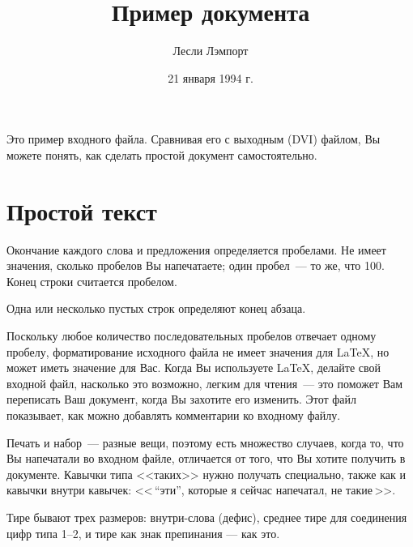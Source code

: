 \documentclass{article}      %
\title{Пример документа}     %
\author{Лесли Лэмпорт}       %
\date{21 января 1994 г.}     %
\begin{document}

\maketitle                   %

Это пример входного файла.  Сравнивая его с выходным (DVI)
файлом, Вы можете понять, как
сделать простой документ самостоятельно.

\section{Простой текст}      %

Окончание каждого слова и предложения определяется
  пробелами.    Не имеет значения, сколько пробелов Вы
напечатаете;           один пробел~--- то же, что 100.  Конец
строки считается пробелом.

Одна    или   несколько пустых строк определяют  конец
абзаца.

Поскольку любое количество последовательных пробелов отвечает одному
пробелу, форматирование исходного файла не имеет значения
для
      \LaTeX,                %
но может иметь значение для Вас.  Когда Вы используете \LaTeX, делайте
свой входной файл, насколько это возможно, легким для чтения~---
это поможет Вам переписать Ваш документ, когда Вы захотите его изменить.
Этот файл показывает, как можно добавлять комментарии ко входному файлу.

Печать и набор~--- разные вещи, поэтому есть множество случаев,
когда то, что Вы напечатали во входном файле, отличается от того, что
Вы хотите получить в документе. Кавычки типа
        <<таких>>
нужно получать специально, также как и кавычки внутри кавычек:
        <<\,``эти'',        %
        которые я сейчас
        напечатал,
        не  \glqq такие\grqq\,>>.

Тире бывают трех размеров:
        внутри-слова
(дефис), среднее тире для соединения цифр типа
        1--2,
и тире как знак препинания
        --- как
это.
\end{document}
